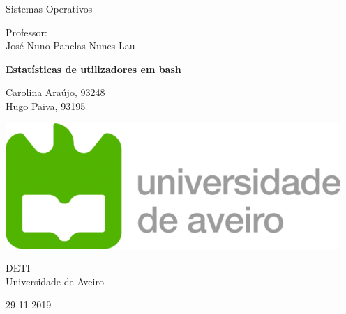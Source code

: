 \documentclass[10pt,portuguese]{article}
\begin{document}

\begin{titlepage}
	\clearpage\thispagestyle{empty}
	\centering
	\vspace{2cm}

	
	{\Large  Sistemas Operativos \par}
	\vspace{0.5cm}
	{\small Professor: \\
	José Nuno Panelas Nunes Lau\par}
	\vspace{4cm}
	{\Huge \textbf{Estatísticas de utilizadores em bash}} \\
	\vspace{1cm}
	\vspace{4cm}
	{\normalsize Carolina Araújo, 93248 \\ 
	             Hugo Paiva, 93195
	   \par}
	\vspace{2cm}

    \includegraphics[scale=0.20]{images/logo_ua.png}
    
    \vspace{2cm}
    
	{\normalsize DETI \\ 
		Universidade de Aveiro \par}
		
	{\normalsize 29-11-2019 \par}
	\vspace{2cm}
	
	\pagebreak

\end{titlepage}
\tableofcontents{}
\clearpage
\end{document}

